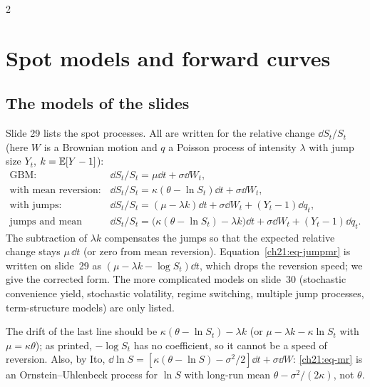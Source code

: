 \begin{paracol}{2}
\section{Spot models and forward curves}\label{ch21:sec-schwartz}
\subsection{The models of the slides}
Slide 29 lists the spot processes. All are written for the relative change $\dd S_t/S_t$ (here $W$ is a Brownian motion and $q$ a Poisson process of intensity $\lambda$ with jump size $Y_t$, $k=\mathbb{E}[Y-1]$):
\begin{align}
  \text{GBM:}\quad & \dd S_t/S_t=\mu\dd t+\sigma\dd W_t,\\
  \text{with mean reversion:}\quad & \dd S_t/S_t=\kappa(\theta-\ln S_t)\dd t+\sigma\dd W_t,\label{ch21:eq-mr}\\
  \text{with jumps:}\quad & \dd S_t/S_t=(\mu-\lambda k)\dd t+\sigma\dd W_t+(Y_t-1)\dd q_t,\label{ch21:eq-jump}\\
  \text{jumps and mean reversion:}\quad & \dd S_t/S_t=\bigl(\kappa(\theta-\ln S_t)-\lambda k\bigr)\dd t+\sigma\dd W_t+(Y_t-1)\dd q_t.\label{ch21:eq-jumpmr}
\end{align}
The subtraction of $\lambda k$ compensates the jumps so that the expected relative change stays $\mu\,\dd t$ (or zero from mean reversion). Equation~\eqref{ch21:eq-jumpmr} is written on slide~29 as $(\mu-\lambda k-\log S_t)\dd t$, which drops the reversion speed; we give the corrected form.
The more complicated models on slide~30 (stochastic convenience yield, stochastic volatility, regime switching, multiple jump processes, term-structure models) are only listed.

\begin{coursenote}
The drift of the last line should be $\kappa(\theta-\ln S_t)-\lambda k$ (or $\mu-\lambda k-\kappa\ln S_t$ with $\mu=\kappa\theta$); as printed, $-\log S_t$ has no coefficient, so it cannot be a speed of reversion.
Also, by Ito, $\dd\ln S=[\kappa(\theta-\ln S)-\sigma^2/2]\dd t+\sigma\dd W$: \eqref{ch21:eq-mr} is an Ornstein--Uhlenbeck process for $\ln S$ with long-run mean $\theta-\sigma^2/(2\kappa)$, not $\theta$.
\end{coursenote}


\end{paracol}
